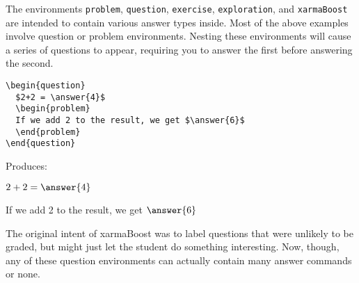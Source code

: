 \documentclass{ximera}
\begin{document}
\begin{example}
The environments \verb!problem!, \verb!question!, \verb!exercise!, \verb!exploration!, and \verb!xarmaBoost! are intended to contain various answer types inside. Most of the above examples involve question or problem environments. Nesting these environments will cause a series of questions to appear, requiring you to answer the first before answering the second.

\begin{verbatim}
\begin{question}
  $2+2 = \answer{4}$
  \begin{problem}
  If we add 2 to the result, we get $\answer{6}$
  \end{problem}
\end{question}
\end{verbatim}

Produces:

\begin{question}
  $2+2 = \answer{4}$
  \begin{problem}
  If we add 2 to the result, we get $\answer{6}$
  \end{problem}
\end{question}

\begin{remark} 
The original intent of xarmaBoost was to label questions that were unlikely to be graded, but might just let the student do something interesting. Now, though, any of these question environments can actually contain many answer commands or none.
\end{remark}
\end{example}
\end{document}
